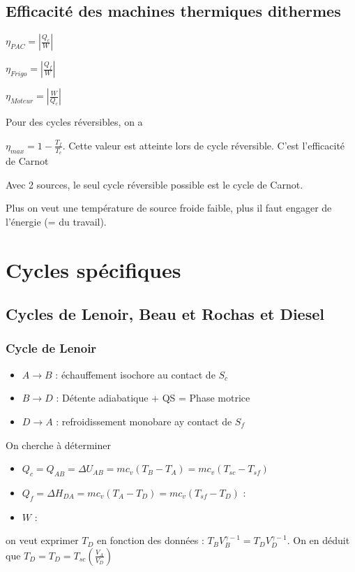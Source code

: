 \documentclass[french]{yLectureNote}
\begin{document}
\subsection{Efficacité des machines thermiques dithermes}
\begin{definition}
    $\eta_{PAC} = |\frac{Q_c}{W}|$

    $\eta_{Frigo} = |\frac{Q_f}{W}|$

    $\eta_{Moteur} = |\frac{W}{Q_c}|$
\end{definition}
Pour des cycles réversibles, on a 
\begin{theorem}
    $\eta_{max} = 1 -\frac{T_f}{T_c}$. Cette valeur est atteinte lors de cycle réversible. C'est l'efficacité de Carnot
\end{theorem}
Avec 2 sources, le seul cycle réversible possible est le cycle de Carnot.

Plus on veut une température de source froide faible, plus il faut engager de l'énergie (= du travail).
\section{Cycles spécifiques}
\subsection{Cycles de Lenoir,  Beau et Rochas et Diesel}
\subsubsection{Cycle de Lenoir}
\begin{itemize}
    \item $A\to B$ : échauffement isochore au contact de $S_c$
    \item $B\to D$ : Détente adiabatique + QS = Phase motrice
    \item $D\to A$ : refroidissement monobare ay contact de $S_f$
\end{itemize}
On cherche à déterminer
\begin{itemize}
    \item $Q_c = Q_{AB} = \Delta U_{AB} = mc_v(T_B-T_A) = mc_v(T_{sc}-T_{sf})$
    \item $Q_f =  \Delta H_{DA} = mc_v(T_A-T_D) = mc_v(T_{sf}-T_{D})$ :
    \item $W$ :
\end{itemize}
on veut exprimer $T_D$ en fonction des données : $T_BV_B^{\gamma-1} = T_DV_D^{\gamma-1}$. On en déduit que 
$T_D = T_{D} = T_{sc}(\frac{V_A}{V_D})$
\end{document}
